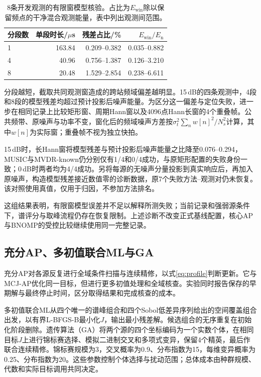 \documentclass[a4paper,fleqn]{cas-sc}
\numberwithin{equation}{section}
\numberwithin{figure}{section}
\numberwithin{table}{section}
\begin{document}
\begin{table}[pos=H]\centering\small
\caption{8条开发观测的有限窗模型核验。占比为$E_{\mathrm{win}}$除以保留频点的干净混合观测能量，表中列出观测间范围。}\label{tab:windowdiagnostic}
\begin{tabular}{@{}lrrr@{}}\toprule
分段数 & 单段时长/$\mu$s & 残差占比/\% & $E_{\mathrm{win}}/E_{\mathrm n}$\\\midrule
1 & 163.84 & 0.209--0.382 & 0.035--0.882\\
4 & 40.96 & 0.756--1.387 & 0.126--3.210\\
8 & 20.48 & 1.529--2.854 & 0.238--6.611\\\bottomrule
\end{tabular}\end{table}
分段越短，截取共同观测窗造成的跨站频域偏差越明显。15\,dB的四条观测中，4段和8段的模型残差均超过预计投影后噪声能量。为区分这一偏差与定位失败，进一步在相同记录上比较矩形窗、周期Hann窗以及4096点Hann长窗的4个重叠帧。公共频带、原噪声与功率不变，窗化后的频域噪声方差按$\sigma_t^2\sum_n w[n]^2/N_s^2$计算，其中$w[n]$为实际窗；重叠帧不视为独立快拍。

15\,dB时，长Hann窗将模型残差与预计投影后噪声能量之比降至0.076--0.294，MUSIC与MVDR-known仍分别仅有1/4和0/4成功，与原矩形配置的失败身份一致；0\,dB时两者均为4/4成功。另将每源的无噪声分量投影到真实响应后，再加入原噪声，构造模型残差接近数值零的诊断数据，原7个失败方法--观测对仍未恢复。该对照使用真值，仅用于归因，不参加方法排名。

这组结果表明，有限窗模型误差并不足以解释所测失败；当前记录和强弱源条件下，谱评分与取峰流程仍存在恢复限制。上述诊断不改变正式基线配置，核心AP与BNOMP的受控比较继续使用同一完整记录。

\subsection{充分AP、多初值联合ML与GA}
充分AP对各源反复进行全域条件扫描与连续精修，以式\eqref{eq:profile}判断更新\cite{ChenHudsonYao2002}。它与MCJ-AP优化同一目标，但进行更多初值处理和全域核查。实验同时报告保存的早期解与最终停止时间，区分取得结果和完成核查的成本。

多初值联合ML从四个唯一的谱峰组合和四个Sobol低差异序列给出的空间覆盖组合出发，以有界L-BFGS-B最小化$J$，输出最小残差解。候选组合的无序重复在初始化阶段删除。遗传算法（GA）将两个源的四个坐标编码为一个实数个体，在相同目标$J$上进行锦标赛选择、模拟二进制交叉和多项式变异\cite{DebAgrawal1995}，保留4个精英，最后作联合连续精修。锦标赛规模为3，交叉概率为0.9、分布指数为15，每维变异概率为0.25、分布指数为20。这些参数控制个体选择与扰动范围；总体成本由种群规模、代数和实际目标调用共同决定。
\end{document}
